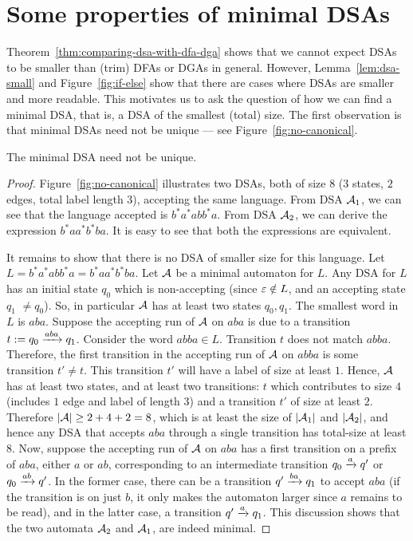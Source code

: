 \section{Some properties of minimal DSAs}
\label{sec:min-dsa-props}
Theorem~\ref{thm:comparing-dsa-with-dfa-dga} shows that we cannot
expect DSAs to be smaller than (trim) DFAs or DGAs in
general. However, Lemma~\ref{lem:dsa-small} and
Figure~\ref{fig:if-else} show that there are cases where DSAs are
smaller and more readable. This motivates us to ask the question of
how we can find a minimal DSA, that is, a DSA of the smallest (total)
size. The first observation is that minimal DSAs need not be unique
--- see Figure~\ref{fig:no-canonical}.

\begin{lemma}
   \label{lem:no-canonical}
   The minimal DSA need not be unique.
 \end{lemma}
\begin{proof}
  Figure~\ref{fig:no-canonical} illustrates two DSAs, both of size $8$ ($3$ states,
  $2$ edges, total label length $3$), accepting
  the same language. From DSA $\mathcal{A}_1$, we can see that the
  language accepted is $b^*a^*abb^*a$. From DSA $\mathcal{A}_2$, we can derive
  the expression $b^*aa^*b^*ba$. It is easy to see that both the
  expressions are equivalent.

  It remains to show that there is no DSA of smaller
  size for this language. Let $L = b^*a^*abb^*a = b^*aa^*b^*ba$. Let
  $\mathcal{A}$ be a minimal automaton for $L$. Any
  DSA for $L$ has an initial state $q_0$ which is non-accepting (since
  $\varepsilon \notin L$, and an accepting state $q_1$ $\neq q_0$). So, in
  particular $\mathcal{A}$ has at least two states $q_0, q_1$. The
  smallest word in $L$ is $aba$. Suppose the accepting run of $\mathcal{A}$ on
  $aba$ is due to a transition $t:= q_0 \xrightarrow{aba} q_1$. Consider the word
  $abba \in L$. Transition $t$ does not match $abba$. Therefore, the
  first transition in the accepting run of $\mathcal{A}$ on $abba$ is some
  transition $t' \neq t$. This transition $t'$ will have a label of
  size at least $1$. Hence, $\mathcal{A}$ has at least two states, and at
  least two transitions: $t$ which contributes to size $4$ (includes
  $1$ edge and label of length $3$) and a transition $t'$ of size at
  least $2$. Therefore $|\mathcal{A}| \ge 2 + 4 + 2 = 8$, which is at least the
  size  of $|\mathcal{A}_1|$ and $|\mathcal{A}_2|$, and hence any DSA that accepts $aba$ through a single transition has total-size at least $8$.
  Now, suppose the accepting run of $\mathcal{A}$ on $aba$ has a
  first transition on a prefix of $aba$, either $a$ or $ab$,
  corresponding to an intermediate transition $q_0 \xrightarrow{a} q'$ or $q_0
  \xrightarrow{ab} q'$. In the former case, there can be a transition $q'
  \xrightarrow{ba} q_1$ to accept $aba$ (if the transition is on just $b$, it only makes the automaton larger since $a$ remains to be read), and in the latter case, a transition
  $q' \xrightarrow{a} q_1$. 
  This discussion shows that the two automata $\mathcal{A}_2$ and $\mathcal{A}_1$,
  are indeed minimal.
\end{proof}

